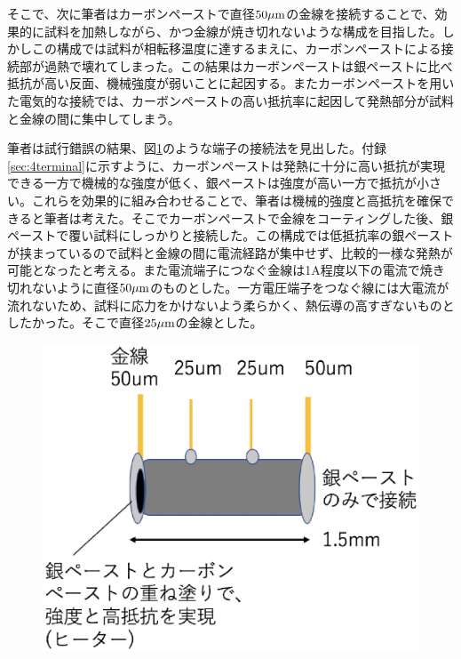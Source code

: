 そこで、次に筆者はカーボンペーストで直径$\rm 50 \mu m$の金線を接続することで、効果的に試料を加熱しながら、かつ金線が焼き切れないような構成を目指した。しかしこの構成では試料が相転移温度に達するまえに、カーボンペーストによる接続部が過熱で壊れてしまった。この結果はカーボンペーストは銀ペーストに比べ抵抗が高い反面、機械強度が弱いことに起因する。またカーボンペーストを用いた電気的な接続では、カーボンペーストの高い抵抗率に起因して発熱部分が試料と金線の間に集中してしまう。

筆者は試行錯誤の結果、図\ref{fig:schematics_sample}のような端子の接続法を見出した。付録\ref{sec:4terminal}に示すように、カーボンペーストは発熱に十分に高い抵抗が実現できる一方で機械的な強度が低く、銀ペーストは強度が高い一方で抵抗が小さい。これらを効果的に組み合わせることで、筆者は機械的強度と高抵抗を確保できると筆者は考えた。そこでカーボンペーストで金線をコーティングした後、銀ペーストで覆い試料にしっかりと接続した。この構成では低抵抗率の銀ペーストが挟まっているので試料と金線の間に電流経路が集中せず、比較的一様な発熱が可能となったと考える。また電流端子につなぐ金線は1A程度以下の電流で焼き切れないように直径$\rm 50 \mu m$のものとした。一方電圧端子をつなぐ線には大電流が流れないため、試料に応力をかけないよう柔らかく、熱伝導の高すぎないものとしたかった。そこで直径$\rm 25 \mu m$の金線とした。
\begin{figure}[!h]
    \begin{center}
   \includegraphics[width=0.4\hsize]{experiment/schematics_sample.eps}
  \end{center}
  \caption{}
  \label{fig:schematics_sample}
\end{figure}

